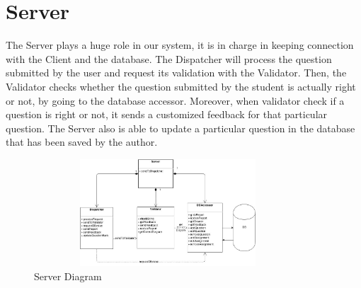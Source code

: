    \chapter{Server}
The Server plays a huge role in our system, it is in charge in keeping connection with the Client and the database. The Dispatcher will process the question submitted by the user and request its validation with the Validator. Then, the Validator checks whether the question submitted by the student is actually right or not, by going to the database accessor. Moreover, when validator check if a question is right or not, it sends a customized feedback for that particular question.
The Server also is able to update a particular question in the database that has been saved by the author. 

                        \begin{figure}[H]
            \centerline{\includegraphics[height=4cm, width=10cm]{Server.jpg}}
            \caption{Server Diagram}
    \end{figure}
    